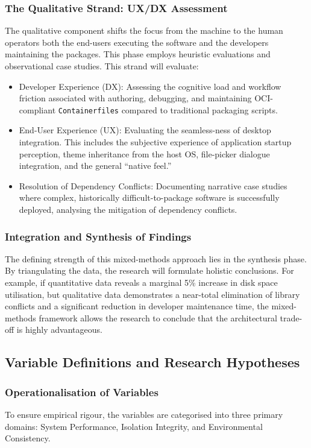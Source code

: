 \documentclass[journal,onecolumn]{IEEEtran}
\newcommand{\code}[1]{\texttt{#1}}
\begin{document}
\subsubsection{The Qualitative Strand: UX/DX Assessment}
The qualitative component shifts the focus from the machine to the human operators both the end-users executing the software and the developers maintaining the packages. This phase employs heuristic evaluations and observational case studies. This strand will evaluate:
\begin{itemize}
    \item Developer Experience (DX): Assessing the cognitive load and workflow friction associated with authoring, debugging, and maintaining OCI-compliant \code{Containerfiles} compared to traditional packaging scripts.
    \item End-User Experience (UX): Evaluating the seamless-ness of desktop integration. This includes the subjective experience of application startup perception, theme inheritance from the host OS, file-picker dialogue integration, and the general ``native feel.''
    \item Resolution of Dependency Conflicts: Documenting narrative case studies where complex, historically difficult-to-package software is successfully deployed, analysing the mitigation of dependency conflicts.
\end{itemize}

\subsubsection{Integration and Synthesis of Findings}
The defining strength of this mixed-methods approach lies in the synthesis phase. By triangulating the data, the research will formulate holistic conclusions. For example, if quantitative data reveals a marginal 5\% increase in disk space utilisation, but qualitative data demonstrates a near-total elimination of library conflicts and a significant reduction in developer maintenance time, the mixed-methods framework allows the research to conclude that the architectural trade-off is highly advantageous.

\subsection{Variable Definitions and Research Hypotheses}

\subsubsection{Operationalisation of Variables}
To ensure empirical rigour, the variables are categorised into three primary domains: System Performance, Isolation Integrity, and Environmental Consistency.
\end{document}
